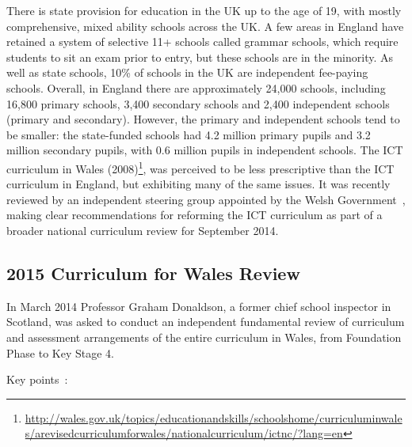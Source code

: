 \documentclass{sig-alternate}
\begin{document}
There is state provision for education in the UK up to the age of 19,
with mostly comprehensive, mixed ability schools across the UK. A few
areas in England have retained a system of selective 11+ schools
called grammar schools, which require students to sit an exam prior to
entry, but these schools are in the minority. As well as state
schools, 10\% of schools in the UK are independent fee-paying
schools. Overall, in England there are approximately 24,000 schools,
including 16,800 primary schools, 3,400 secondary schools and 2,400
independent schools (primary and secondary).  However, the primary and
independent schools tend to be smaller: the state-funded schools had
4.2 million primary pupils and 3.2 million secondary pupils, with 0.6
million pupils in independent schools. The ICT
curriculum in Wales
(2008)\footnote{\url{http://wales.gov.uk/topics/educationandskills/schoolshome/curriculuminwales/arevisedcurriculumforwales/nationalcurriculum/ictnc/?lang=en}},
was perceived to be less prescriptive than the ICT curriculum in
England, but exhibiting many of the same issues. It was recently
reviewed by an independent steering group appointed by the Welsh
Government~\cite{welshictreview:2013}, making clear recommendations for
reforming the ICT curriculum as part of a broader national curriculum
review for September 2014.

\subsection{2015 Curriculum for Wales Review}

In March 2014 Professor Graham Donaldson, a former chief school
inspector in Scotland, was asked to conduct an independent fundamental
review of curriculum and assessment arrangements of the entire
curriculum in Wales, from Foundation Phase to Key Stage 4.

Key points~\cite{Donaldson:2015}:
\end{document}
